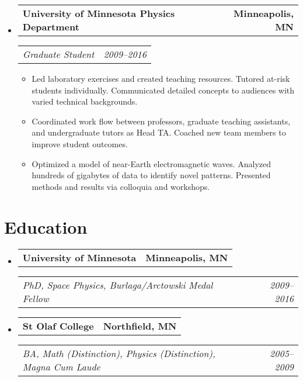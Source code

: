 \documentclass[11pt,letterpaper]{article}
\makeatletter
\newcommand{\headerrow}[2]{
    \begin{tabular*}{\linewidth}{l@{ \extracolsep{\fill} }r} #1 & #2
    \end{tabular*}
}
\newcommand{\YearRange}[2]{#1--#2}
\newcommand{\ResumeSection}[1]{
    \section*{ {\color{MidnightBlue}#1 \sout{\hfill} } }
}
\makeatother
\begin{document}
\begin{itemize}[leftmargin=\parindent]
    \item[]
        \headerrow
            { \textbf{University of Minnesota Physics Department} }
            { \textbf{Minneapolis, MN} }
        \headerrow
            { \emph{Graduate Student} }
            { \emph{ \YearRange{2009}{2016} } }
        \begin{itemize}
            \item Led laboratory exercises and created teaching resources. Tutored at-risk students individually. Communicated detailed concepts to audiences with varied technical backgrounds.
            \item Coordinated work flow between professors, graduate teaching assistants, and undergraduate tutors as Head TA. Coached new team members to improve student outcomes.
            \item Optimized a model of near-Earth electromagnetic waves. Analyzed hundreds of gigabytes of data to identify novel patterns. Presented methods and results via colloquia and workshops.
        \end{itemize}

\end{itemize}


\ResumeSection{Education}

\begin{itemize}[leftmargin=\parindent]
    \parskip=0.1em

    \item[]
        \headerrow
            { \textbf{University of Minnesota} }
            { \textbf{Minneapolis, MN} }
        \headerrow
            { \emph{PhD, Space Physics, Burlaga/Arctowski Medal Fellow} }
            { \emph{ \YearRange{2009}{2016} } }

    \vspace{-10pt}

    \item[]
        \headerrow
            { \textbf{St Olaf College} }
            { \textbf{Northfield, MN} }
        \headerrow
            { \emph{BA, Math (Distinction), Physics (Distinction),
                 Magna Cum Laude} }
            { \emph{ \YearRange{2005}{2009} } }

\end{itemize}

\end{document}
